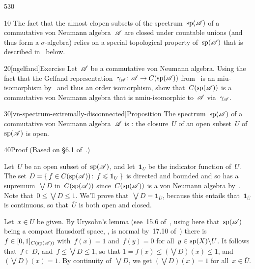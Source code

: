 \begin{parsec}{530}%
\begin{point}{10}%
The fact that the almost clopen subsets
of the spectrum~$\mathrm{sp}(\mathscr{A})$
of a commutative von Neumann algebra~$\mathscr{A}$
are closed under countable unions
(and thus form a $\sigma$-algebra)
relies on a special topological property of~$\mathrm{sp}(\mathscr{A})$
that is described in~ below.
\end{point}
\begin{point}{20}[ngelfand]{Exercise}%
Let~$\mathscr{A}$ be a commutative von Neumann algebra.
Using the fact that
the Gelfand representation~$\gamma_{\mathscr{A}}\colon \mathscr{A}\to C(\mathrm{sp}(\mathscr{A}))$
from~
is an miu-isomorphism 
by~
and thus an order isomorphism,
show that~$C(\mathrm{sp}(\mathscr{A}))$
is a commutative von Neumann algebra
that is nmiu-isomorphic
to~$\mathscr{A}$ via~$\gamma_{\mathscr{A}}$.
\end{point}
\begin{point}{30}[vn-spectrum-extremally-disconnected]{Proposition}%
The spectrum~$\mathrm{sp}(\mathscr{A})$
of a commutative von Neumann algebra~$\mathscr{A}$
is :%
the closure~$\overline{U}$
of an open subset~$U$ of~$\mathrm{sp}(\mathscr{A})$
is open.
\begin{point}{40}{Proof}%
(Based on \S6.1 of~\cite{riesz}.)

Let~$U$ be an open subset of~$\mathrm{sp}(\mathscr{A})$,
and let~$\mathbf{1}_U$ be the indicator function
of~$U$.
The set $D=\{\,f\in C(\mathrm{sp}(\mathscr{A}))\colon\, f\leqslant \mathbf{1}_U\,\}$
is directed and bounded 
and so has a supremum~$\bigvee D$
in~$C(\mathrm{sp}(\mathscr{A}))$
since~$C(\mathrm{sp}(\mathscr{A}))$ is a von Neumann algebra by~.
Note that~$0\leq \bigvee D\leq 1$.
We'll prove that~$\bigvee D = \mathbf{1}_{\overline{U}}$,
because this entails
that~$\mathbf{1}_{\overline{U}}$
is continuous,  so that~$\overline{U}$ is both open and closed.

Let~$x\in U$ be given.
By Urysohn's lemma (see~15.6 of~\cite{willard},
using here that~$\mathrm{sp}(\mathscr{A})$ being a compact Hausdorff
space, , 
is normal by~17.10 of~\cite{willard})
there is $f\in [0,1]_{C(\mathrm{sp}(\mathscr{A}))}$
with~$f(x)=1$ and~$f(y)=0$ for all~$y\in \mathrm{sp}(X)\backslash U$.
It follows that~$f\in D$,
and~$f\leq \bigvee D\leq 1$,
so that $1=f(x)\leq (\bigvee D)(x)\leq 1$,
and~$(\bigvee D)(x)=1$.
By continuity of~$\bigvee D$,
we get $(\bigvee D)(x)=1$ for all~$x\in \overline{U}$.


\end{point}
\end{point}
\end{parsec}
